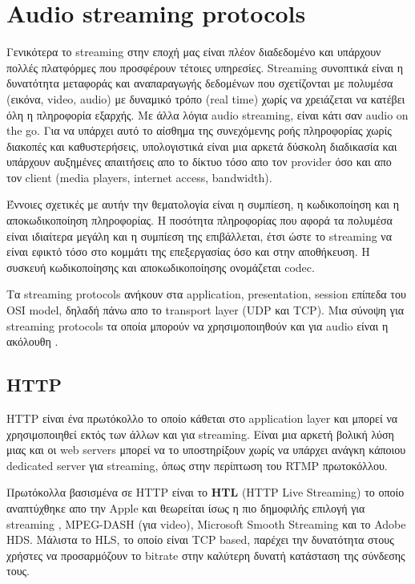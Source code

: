 \documentclass[hidelinks, 12pt, a4paper]{article}
\begin{document}
\section{Audio streaming protocols}

Γενικότερα το streaming στην εποχή μας είναι πλέον διαδεδομένο και υπάρχουν πολλές πλατφόρμες που προσφέρουν τέτοιες υπηρεσίες. Streaming συνοπτικά είναι η δυνατότητα μεταφοράς και αναπαραγωγής δεδομένων που σχετίζονται με πολυμέσα (εικόνα, video, audio) με δυναμικό τρόπο (real time) χωρίς να χρειάζεται να κατέβει όλη η πληροφορία εξαρχής. Με άλλα λόγια audio streaming, είναι κάτι σαν audio on the go. Για να υπάρχει αυτό το αίσθημα της συνεχόμενης ροής πληροφορίας χωρίς διακοπές και καθυστερήσεις, υπολογιστικά είναι μια αρκετά  δύσκολη διαδικασία  και υπάρχουν αυξημένες απαιτήσεις απο το δίκτυο τόσο απο τον provider όσο και απο τον client (media players, internet access, bandwidth). 

Έννοιες σχετικές με αυτήν την θεματολογία είναι η συμπίεση, η κωδικοποίηση και η αποκωδικοποίηση πληροφορίας. Η ποσότητα πληροφορίας που αφορά τα πολυμέσα είναι ιδιαίτερα μεγάλη και η συμπίεση της επιβάλλεται, έτσι ώστε το streaming να είναι εφικτό τόσο στο κομμάτι της επεξεργασίας όσο και στην αποθήκευση. Η συσκευή κωδικοποίησης και αποκωδικοποίησης ονομάζεται codec.

Τα streaming protocols ανήκουν στα application, presentation, session επίπεδα του OSI model, δηλαδή πάνω απο το transport layer (UDP και TCP). Μια σύνοψη για streaming protocols τα οποία μπορούν να χρησιμοποιηθούν και για audio είναι η ακόλουθη \cite{wowza, stackexchange_audio, wowza_rtsp}.

\subsection{HTTP}

HTTP είναι ένα πρωτόκολλο το οποίο κάθεται στο application layer και μπορεί να χρησιμοποιηθεί εκτός των άλλων και για streaming. Είναι μια αρκετή βολική λύση μιας και οι web servers μπορεί να το υποστηρίξουν χωρίς να υπάρχει ανάγκη κάποιου dedicated server για streaming, όπως στην περίπτωση του RTMP πρωτοκόλλου. 

Πρωτόκολλα βασισμένα σε HTTP είναι το \textbf{HTL} (HTTP Live Streaming) το οποίο αναπτύχθηκε απο την Apple και θεωρείται ίσως η πιο δημοφιλής επιλογή για streaming \cite{wiki_hls}, MPEG-DASH (για video), Microsoft Smooth Streaming και το Adobe HDS. Μάλιστα το HLS, το οποίο είναι TCP based, παρέχει την δυνατότητα στους χρήστες να προσαρμόζουν το bitrate στην καλύτερη δυνατή κατάσταση της σύνδεσης τους.
\end{document}
